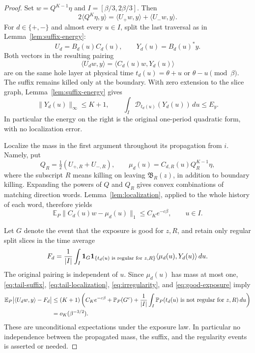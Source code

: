 \begin{proof}
Set \(w=Q^{K-1}\eta\) and \(I=[\beta/3,2\beta/3]\). Then
\[
 2\langle Q^K\eta,y\rangle
 =\langle U_+w,y\rangle+\langle U_-w,y\rangle.
\]
For \(d\in\{+,-\}\) and almost every \(u\in I\), split the last
traversal as in Lemma~\ref{lem:suffix-energy}:
\[
 U_d=B_d(u)C_d(u),\qquad Y_d(u)=B_d(u)^*y.
\]
Both vectors in the resulting pairing
\[
 \langle U_dw,y\rangle=\langle C_d(u)w,Y_d(u)\rangle
\]
are on the same hole layer at physical time
\(t_d(u)=\theta+u\) or \(\theta-u\pmod\beta\).
The suffix remains killed only at the boundary. With zero extension to
the slice graph, Lemma~\ref{lem:suffix-energy} gives
\begin{equation}\label{eq:tail-suffix}
 \|Y_d(u)\|_\infty\le K+1,\qquad
 \int_I\mathcal D_{t_d(u)}(Y_d(u))\,du\le E_y.
\end{equation}
In particular the energy on the right is the original one-period
quadratic form, with no localization error.

Localize the mass in the first argument throughout its propagation
from \(i\). Namely, put
\[
 Q_R=\tfrac12(U_{+,R}+U_{-,R}),\qquad
 \mu_d(u)=C_{d,R}(u)Q_R^{K-1}\eta,
\]
where the subscript \(R\) means killing on leaving
\(\mathfrak B_R(z)\), in addition to boundary killing.
Expanding the powers of \(Q\) and \(Q_R\) gives convex combinations
of matching direction words. Lemma~\ref{lem:localization}, applied
to the whole history of each word, therefore yields
\begin{equation}\label{eq:tail-localization}
 \mathbb E_P\|C_d(u)w-\mu_d(u)\|_1\le C_K e^{-c\beta},
 \qquad u\in I.
\end{equation}

Let \(G\) denote the event that the exposure is good for \(z,R\),
and retain only regular split slices in the time average
\[
 F_d=\frac1{|I|}\int_I
  \mathbf1_{G}\mathbf1_{\{t_d(u)\text{ is regular for }z,R\}}
       \langle\mu_d(u),Y_d(u)\rangle\,du.
\]
The original pairing is independent of \(u\). Since \(\mu_d(u)\)
has mass at most one, \eqref{eq:tail-suffix},
\eqref{eq:tail-localization}, \eqref{eq:irregularity}, and
\eqref{eq:good-exposure} imply
\begin{align}
 \mathbb E_P\bigl|\langle U_dw,y\rangle-F_d\bigr|
 &\le(K+1)\left(C_K e^{-c\beta}+\mathbb P_P(G^c)
    +\frac1{|I|}\int_I
       \mathbb P_P(t_d(u)\text{ is not regular for }z,R)\,du\right)
       \notag\\
 &=o_K(\beta^{-3/2}).\label{eq:tail-discarded}
\end{align}
These are unconditional expectations under the exposure law. In
particular no independence between the propagated mass, the suffix,
and the regularity events is asserted or needed.


\end{proof}
